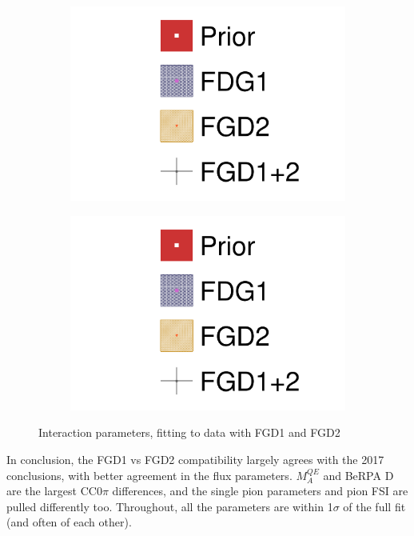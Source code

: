 \begin{figure}[h]
	\begin{subfigure}[t]{0.49\textwidth}
		\includegraphics[width=\textwidth,page=20, trim={0mm 0mm 0mm 9mm}, clip]{figures/mach3/2018/data/2018a_FixedCov_RedCov_Mpi_FGD1Only_Data_merge_2018a_FixedCov_RedCov_Mpi_FGD2Only_Data_merge_2018a_FixedCov_RedCov_Mpi_Data_merge}
	\end{subfigure}
	\begin{subfigure}[t]{0.49\textwidth}
		\includegraphics[width=\textwidth,page=21, trim={0mm 0mm 0mm 9mm}, clip]{figures/mach3/2018/data/2018a_FixedCov_RedCov_Mpi_FGD1Only_Data_merge_2018a_FixedCov_RedCov_Mpi_FGD2Only_Data_merge_2018a_FixedCov_RedCov_Mpi_Data_merge}
	\end{subfigure}
	\caption{Interaction parameters, fitting to data with FGD1 and FGD2}
	\label{fig:data_fdg1vsfgd2_2018_xsec}
\end{figure}

In conclusion, the FGD1 vs FGD2 compatibility largely agrees with the 2017 conclusions, with better agreement in the flux parameters. $M_A^{QE}$ and BeRPA D are the largest CC0$\pi$ differences, and the single pion parameters and pion FSI are pulled differently too. Throughout, all the parameters are within 1$\sigma$ of the full fit (and often of each other).

